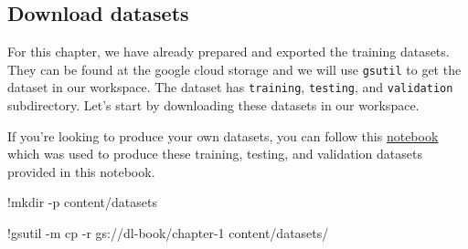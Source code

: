 \documentclass[
  letterpaper,
  DIV=11,
  numbers=noendperiod]{scrreprt}
\newenvironment{Shaded}{\begin{snugshade}}{\end{snugshade}}
\newcommand{\DecValTok}[1]{\textcolor[rgb]{0.68,0.00,0.00}{#1}}
\newcommand{\NormalTok}[1]{\textcolor[rgb]{0.00,0.23,0.31}{#1}}
\newcommand{\OperatorTok}[1]{\textcolor[rgb]{0.37,0.37,0.37}{#1}}
\begin{document}
\subsection{Download datasets}\label{download-datasets}

For this chapter, we have already prepared and exported the training
datasets. They can be found at the google cloud storage and we will use
\texttt{gsutil} to get the dataset in our workspace. The dataset has
\texttt{training}, \texttt{testing}, and \texttt{validation}
subdirectory. Let's start by downloading these datasets in our
workspace.

If you're looking to produce your own datasets, you can follow this
\href{https://colab.research.google.com/drive/1LCFLeSCu969wIW8TD68-j4hfIu7WiRIK?usp=sharing}{notebook}
which was used to produce these training, testing, and validation
datasets provided in this notebook.

\begin{Shaded}
\begin{Highlighting}[]
\OperatorTok{!}\NormalTok{mkdir }\OperatorTok{{-}}\NormalTok{p content}\OperatorTok{/}\NormalTok{datasets}
\end{Highlighting}
\end{Shaded}

\begin{Shaded}
\begin{Highlighting}[]
\OperatorTok{!}\NormalTok{gsutil }\OperatorTok{{-}}\NormalTok{m cp }\OperatorTok{{-}}\NormalTok{r gs:}\OperatorTok{//}\NormalTok{dl}\OperatorTok{{-}}\NormalTok{book}\OperatorTok{/}\NormalTok{chapter}\OperatorTok{{-}}\DecValTok{1}\NormalTok{ content}\OperatorTok{/}\NormalTok{datasets}\OperatorTok{/}
\end{Highlighting}
\end{Shaded}
\end{document}
